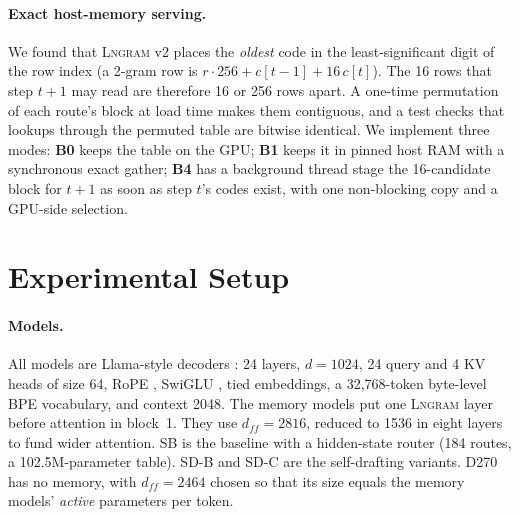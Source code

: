 \documentclass[11pt]{article}
\newcommand{\SB}{\textsc{SB}}
\newcommand{\SDB}{\textsc{SD-B}}
\newcommand{\SDC}{\textsc{SD-C}}
\newcommand{\Dense}{\textsc{D270}}
\newcommand{\Lngram}{\textsc{Lngram}}
\begin{document}
\paragraph{Exact host-memory serving.}
We found that \Lngram{} v2 places the \emph{oldest} code in the least-significant digit of the row index (a 2-gram row
is $r\cdot256+c[t-1]+16\,c[t]$). The 16 rows that step $t{+}1$ may read are therefore 16 or 256 rows apart. A one-time
permutation of each route's block at load time makes them contiguous, and a test checks that lookups through the permuted
table are bitwise identical. We implement three modes: \textbf{B0} keeps the table on the GPU; \textbf{B1} keeps it in
pinned host RAM with a synchronous exact gather; \textbf{B4} has a background thread stage the 16-candidate block for $t{+}1$
as soon as step $t$'s codes exist, with one non-blocking copy and a GPU-side selection.

\section{Experimental Setup}
\label{sec:setup}

\paragraph{Models.}
All models are Llama-style decoders \citep{touvron2023llama}: 24 layers, $d{=}1024$, 24 query and 4 KV heads
\citep{ainslie2023gqa} of size 64, RoPE \citep{su2021roformer}, SwiGLU \citep{shazeer2020glu}, tied embeddings, a
32{,}768-token byte-level BPE vocabulary, and context 2048. The memory models put one \Lngram{} layer before attention in
block~1. They use $d_{ff}{=}2816$, reduced to 1536 in eight layers to fund wider attention. \SB{} is the baseline with a
hidden-state router (184 routes, a 102.5M-parameter table). \SDB{} and \SDC{} are the self-drafting variants. \Dense{} has no
memory, with $d_{ff}{=}2464$ chosen so that its size equals the memory models' \emph{active} parameters per token.
\end{document}
